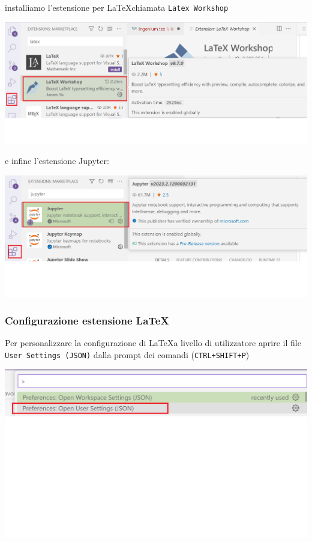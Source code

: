 \documentclass[a4paper]{article}
\begin{document}
installiamo l'estensione per \LaTeX chiamata \verb|Latex Workshop|

\includegraphics[scale=0.4]{vscode-latex.png}


e infine l'estensione Jupyter:

\includegraphics[scale=0.4]{img/vscode-jupyter.png}

\newpage

\subsubsection*{Configurazione estensione \LaTeX}
Per personalizzare la configurazione di \LaTeX a livello di utilizzatore aprire il file \verb|User Settings (JSON)| dalla prompt dei comandi (\verb|CTRL+SHIFT+P|)

\includegraphics[scale=0.5]{img/vscode-latex-json.png}
\end{document}
